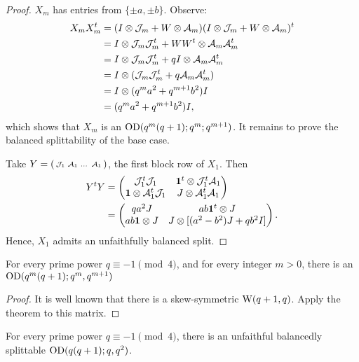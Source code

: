 \documentclass[../../../main]{subfiles}
\begin{document}
\begin{proof}
 $X_m$ has entries from $\{\pm a, \pm b\}$. Observe:
 \begin{align*}
  X_mX_m^t &= (I \otimes \mathcal{J}_m + W \otimes \mathcal{A}_m)(I \otimes \mathcal{J}_m + W \otimes \mathcal{A}_m)^t \\
  &= I \otimes \mathcal{J}_m\mathcal{J}_m^t + WW^t \otimes \mathcal{A}_m\mathcal{A}_m^t \\
  &= I \otimes \mathcal{J}_m\mathcal{J}_m^t + qI \otimes \mathcal{A}_m\mathcal{A}_m^t \\
  &= I \otimes (\mathcal{J}_m\mathcal{J}_m^t + q\mathcal{A}_m\mathcal{A}_m^t) \\
  &= I \otimes (q^ma^2 + q^{m+1}b^2)I \\
  &= (q^ma^2 + q^{m+1}b^2)I,
 \end{align*}
 which shows that $X_m$ is an $\text{OD}(q^m(q+1); q^m; q^{m+1})$. It remains to prove the balanced splittability of the base case.
 
 Take $Y=(\begin{smallmatrix} \mathcal{J}_1 & \mathcal{A}_1 & \dots & \mathcal{A}_1 \end{smallmatrix})$, the first block row of $X_1$. Then
 \begin{align*}
  Y^tY &= \begin{pmatrix} \mathcal{J}_1^t\mathcal{J}_1 & \mathbf{1}^t \otimes \mathcal{J}_1^t\mathcal{A}_1 \\ \mathbf{1} \otimes \mathcal{A}_1^t\mathcal{J}_1 & J \otimes \mathcal{A}_1^t\mathcal{A}_1 \end{pmatrix} \\
  &= \begin{pmatrix} qa^2J & ab\mathbf{1}^t \otimes J \\ ab\mathbf{1} \otimes J & J \otimes [(a^2-b^2)J + qb^2I] \end{pmatrix}.
 \end{align*}
 Hence, $X_1$ admits an unfaithfully balanced split.
\end{proof}

\begin{cor}
 For every prime power $q \equiv -1 \pmod{4}$, and for every integer $m>0$, there is an $\text{OD}(q^m(q+1); q^m, q^{m+1})$
\end{cor}

\begin{proof}
  It is well known \cite[see][]{combinatorics-of-symmetric-designs} that there is a skew-symmetric $\text{W}(q+1,q)$. Apply the theorem to this matrix.
\end{proof}

\begin{cor}
 For every prime power $q \equiv -1 \pmod{4}$, there is an unfaithful balancedly splittable $\text{OD}(q(q+1); q, q^2)$. 
\end{cor}
\end{document}
